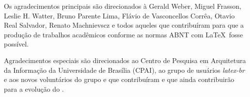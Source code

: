 \begin{agradecimentos}
    Os agradecimentos principais são direcionados à Gerald Weber, Miguel Frasson,
    Leslie H. Watter, Bruno Parente Lima, Flávio de Vasconcellos Corrêa, Otavio Real
    Salvador, Renato Machnievscz e todos aqueles que
    contribuíram para que a produção de trabalhos acadêmicos conforme
    as normas ABNT com \LaTeX\ fosse possível.

    Agradecimentos especiais são direcionados ao Centro de Pesquisa em Arquitetura
    da Informação da Universidade de
    Brasília (CPAI), ao grupo de usuários
    \emph{latex-br} e aos
    novos voluntários do grupo
    \emph{\abnTeX} e que contribuíram e que ainda
    contribuirão para a evolução do \abnTeX.
\end{agradecimentos}